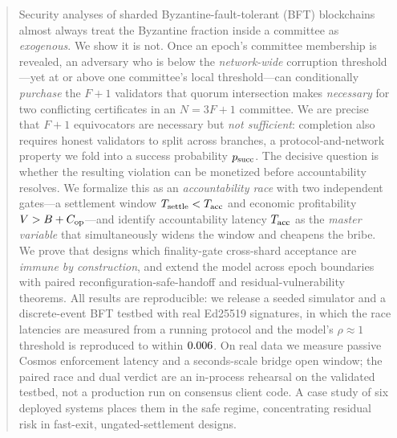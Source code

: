 \begin{abstract}
Security analyses of sharded Byzantine-fault-tolerant (BFT) blockchains almost always treat the
Byzantine fraction inside a committee as \emph{exogenous}. We show it is not. Once an epoch's
committee membership is revealed, an adversary who is below the \emph{network-wide} corruption
threshold---yet at or above one committee's local threshold---can conditionally \emph{purchase} the
$F{+}1$ validators that quorum intersection makes \emph{necessary} for two conflicting certificates
in an $N{=}3F{+}1$ committee. We are precise that $F{+}1$ equivocators are necessary but \emph{not
sufficient}: completion also requires honest validators to split across branches, a
protocol-and-network property we fold into a success probability $\psucc$. The decisive question is
whether the resulting violation can be monetized before accountability resolves. We formalize this
as an \emph{accountability race} with two independent gates---a settlement window $\Tsettle<\Tacc$
and economic profitability $V>B+\Cop$---and identify accountability latency $\Tacc$ as the
\emph{master variable} that simultaneously widens the window and cheapens the bribe. We prove that
designs which finality-gate cross-shard acceptance are \emph{immune by construction}, and extend the
model across epoch boundaries with paired reconfiguration-safe-handoff and residual-vulnerability
theorems. All results are reproducible: we release a seeded simulator and a discrete-event BFT
testbed with real Ed25519 signatures, in which the race latencies are measured from a running
protocol and the model's $\rho{\approx}1$ threshold is reproduced to within $\ArtifactMaxValErr$. On
real data we measure passive Cosmos enforcement latency and a seconds-scale bridge open window; the
paired race and dual verdict are an in-process rehearsal on the validated testbed, not a production
run on consensus client code. A case study of six deployed systems places them in the safe regime,
concentrating residual risk in fast-exit, ungated-settlement designs.
\end{abstract}

